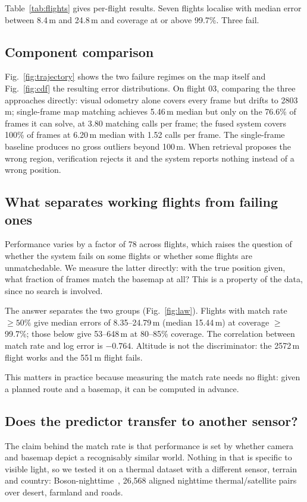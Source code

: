 \documentclass[conference]{IEEEtran}
\begin{document}
Table~\ref{tab:flights} gives per-flight results. Seven flights localise with
median error between 8.4\,m and 24.8\,m and coverage at or above 99.7\%. Three
fail.

\subsection{Component comparison}

Fig.~\ref{fig:trajectory} shows the two failure regimes on the map itself and
Fig.~\ref{fig:cdf} the resulting error distributions.
On flight 03, comparing the three approaches directly: visual odometry alone
covers every frame but drifts to 2803\,m; single-frame map matching achieves
5.46\,m median but only on the 76.6\% of frames it can solve, at 3.80 matching
calls per frame; the fused system covers 100\% of frames at 6.20\,m median with
1.52 calls per frame. The single-frame baseline produces no gross outliers
beyond 100\,m. When retrieval proposes the wrong region, verification rejects
it and the system reports nothing instead of a wrong position.

\subsection{What separates working flights from failing ones}
\label{sec:law}
Performance varies by a factor of 78 across flights, which raises the question
of whether the system fails on some flights or whether some flights are
unmatched\-able. We measure the latter directly: with the true position given,
what fraction of frames match the basemap at all? This is a property of the
data, since no search is involved.

The answer separates the two groups (Fig.~\ref{fig:law}).
Flights with match rate $\geq 50\%$ give
median errors of 8.35--24.79\,m (median 15.44\,m) at coverage $\geq$99.7\%;
those below give 53--648\,m at 80--85\% coverage. The correlation between match
rate and log error is $-0.764$. Altitude is not the discriminator: the 2572\,m
flight works and the 551\,m flight fails.

This matters in practice because measuring the match rate needs no flight:
given a planned route and a basemap, it can be computed in advance.

\subsection{Does the predictor transfer to another sensor?}
\label{sec:night}
The claim behind the match rate is that performance is set by whether camera
and basemap depict a recognisably similar world. Nothing in that is specific
to visible light, so we tested it on a thermal dataset with a different
sensor, terrain and country: Boson-nighttime~\cite{sthn}, 26{,}568 aligned
nighttime thermal/satellite pairs over desert, farmland and roads.
\end{document}
